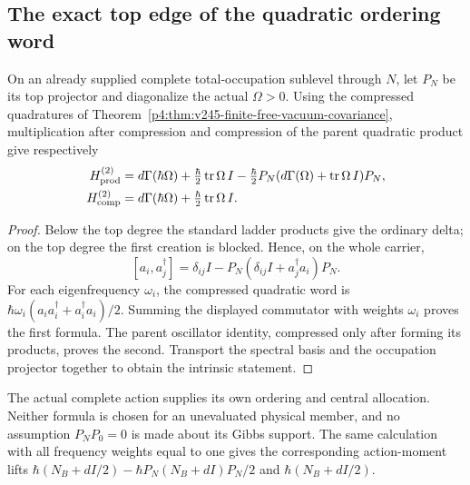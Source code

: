 \documentclass[12pt,a4paper]{article}
\begin{document}
\subsection{The exact top edge of the quadratic ordering word}
\begin{lemma}
\label{p4:lem:v2174-weighted-ordering-boundary}
On an already supplied complete total-occupation sublevel through $N$,
let $P_N$ be its top projector and diagonalize the actual $\Omega>0$.
Using the compressed quadratures of
Theorem~\ref{p4:thm:v245-finite-free-vacuum-covariance}, multiplication
after compression and compression of the parent quadratic product give
respectively
\begin{align}
 H_{\rm prod}^{(2)}={}&d\Gamma(\hbar\Omega)
   +\tfrac\hbar2\operatorname{tr}\Omega\,I
   -\tfrac\hbar2P_N(d\Gamma(\Omega)+\operatorname{tr}\Omega\,I)P_N,
   \nonumber\\
 H_{\rm comp}^{(2)}={}&d\Gamma(\hbar\Omega)
   +\tfrac\hbar2\operatorname{tr}\Omega\,I.
 \label{p4:eq:v2174-weighted-ordering-boundary}
\end{align}
\end{lemma}
\begin{proof}
Below the top degree the standard ladder products give the ordinary delta;
on the top degree the first creation is blocked. Hence, on the whole carrier,
\[
 [a_i,a_j^\dagger]=\delta_{ij}I
    -P_N(\delta_{ij}I+a_j^\dagger a_i)P_N.
\]
For each eigenfrequency $\omega_i$, the compressed quadratic word is
$\hbar\omega_i(a_ia_i^\dagger+a_i^\dagger a_i)/2$.
Summing the displayed commutator with weights $\omega_i$ proves the first
formula. The parent oscillator identity, compressed only after forming
its products, proves the second. Transport the spectral basis and the
occupation projector together to obtain the intrinsic statement.
\end{proof}
The actual complete action supplies its own ordering and central allocation.
Neither formula is chosen for an unevaluated physical member, and no
assumption $P_NP_0=0$ is made about its Gibbs support. The same calculation
with all frequency weights equal to one gives the corresponding action-moment
lifts $\hbar(N_B+dI/2)-\hbar P_N(N_B+dI)P_N/2$ and
$\hbar(N_B+dI/2)$.


\end{document}
